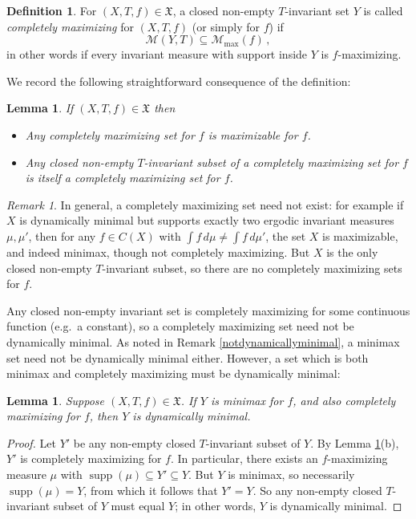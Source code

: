 \documentclass[reqno,11pt]{amsart}
\newtheorem{lem}[thm]{Lemma}
\theoremstyle{definition}
\newtheorem{defn}[thm]{Definition}
\theoremstyle{remark}
\theoremstyle{remark}
\newtheorem{rem}[thm]{Remark}
\def\m{\mathcal M}
\newcommand{\supp}{\operatorname{supp}}
\def\X{\mathfrak{X}}
\numberwithin{equation}{section}
\begin{document}
\begin{defn}\label{completelymaximizingdefn}
For  $(X,T,f)\in\X$,
a closed non-empty $T$-invariant set $Y$ 
is called
\emph{completely maximizing} for  $(X,T,f)$ (or simply for $f$)
if 
\begin{equation}\label{mcmmax}
\m(Y,T)\subseteq\m_{\max}(f)\,,
\end{equation}
in other words if every invariant measure with support inside $Y$
is $f$-maximizing.
\end{defn}



We record the following straightforward consequence of the definition:

\begin{lem}\label{subsetcompletelymaximizing}
If $(X,T,f)\in\X$ then
\begin{itemize}
\item[(a)]
Any completely maximizing set for $f$ is maximizable for $f$.
\item[(b)]
Any  closed non-empty $T$-invariant subset
of a completely maximizing set for $f$ is itself
a completely maximizing set for $f$.
\end{itemize}
\end{lem}

\begin{rem}\label{completelymaximizingremark}
In general, a completely maximizing set need not exist: for example if $X$ is dynamically minimal but supports exactly two ergodic invariant measures $\mu, \mu'$, then  for any $f\in C(X)$ with $\int f\, d\mu \neq \int f\,d\mu'$,
the set $X$ is maximizable, and indeed minimax, though not completely maximizing.
But $X$
is the only closed non-empty $T$-invariant subset, so there are no completely maximizing sets for $f$.
\end{rem}


Any closed non-empty invariant set is completely maximizing for some continuous function
(e.g.~a constant), so 
a completely maximizing set
need not be dynamically minimal.
As noted in Remark \ref{notdynamicallyminimal},
a minimax set need not be dynamically minimal either.
However, a set which is both minimax and completely maximizing must be dynamically minimal:


\begin{lem}\label{completelymaximizingminimaximpliesdynamicallyminimal}
Suppose $(X,T,f)\in\X$.
If $Y$ is minimax for $f$, and also completely maximizing for $f$, then $Y$ is dynamically minimal.
\end{lem}
\begin{proof}
Let $Y'$ be any non-empty closed $T$-invariant subset of $Y$.
By Lemma \ref{subsetcompletelymaximizing}(b), $Y'$ is completely maximizing for $f$.
In particular, there exists an $f$-maximizing measure $\mu$ with $\supp(\mu)\subseteq Y' \subseteq Y$.
But $Y$ is minimax, so necessarily $\supp(\mu)=Y$, from which it follows that $Y'=Y$.
So  any non-empty closed $T$-invariant subset of $Y$ must equal $Y$; in other words, $Y$ is dynamically minimal.
\end{proof}
\end{document}
